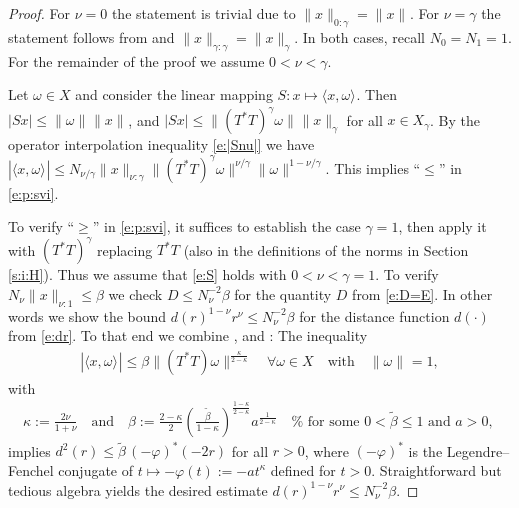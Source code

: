 \documentclass[10pt, a4paper]{iopart}
\newcommand{\norm}[2]{     \| #1       \|_{ #2 }}
\newcommand{\scalar}[2]{     \langle #1       \rangle_{ #2 }}
\theoremstyle{remark}
\theoremstyle{definition}
\begin{document}
\begin{proof}
	For $\nu = 0$ the statement is trivial
	due to
	$\norm{x}{0:\gamma} = \norm{x}{}$.
	For $\nu = \gamma$
	the statement follows from \cite[Lemma 8.21]{ScherzerBook2009}
	and $\norm{x}{\gamma:\gamma} = \norm{x}{\gamma}$.
	In both cases, recall $N_0 = N_1 = 1$.
	For the remainder of the proof 
	we assume $0 < \nu < \gamma$.

	Let $\omega \in X$ 
	and
	consider the linear mapping $S : x \mapsto \scalar{ x, \omega }{}$.
	Then
	$| S x | \leq \norm{\omega}{} \norm{x}{}$,
	and
	$| S x | \leq \norm{(T^* T)^{\gamma} \omega}{} \norm{x}{\gamma}$
	for all $x \in X_{\gamma}$.
	By the operator interpolation inequality \eqref{e:|Snu|}
	we have
	$
		| \scalar{ x, \omega }{} |
	\leq
		N_{\nu/\gamma}
		\norm{x}{\nu : \gamma}
		\norm{(T^* T)^{\gamma} \omega}{}^{\nu/\gamma}
		\norm{\omega}{}^{1 - \nu/\gamma}
	$.
	This implies ``$\leq$'' in \eqref{e:p:svi}.
	
	
	To verify ``$\geq$'' in \eqref{e:p:svi},
	it suffices to establish the case $\gamma = 1$,
	then apply it 
	with $(T^* T)^\gamma$ replacing $T^* T$ 
	(also in the definitions of the norms in Section \ref{s:i:H}).
	Thus we assume that \eqref{e:S} holds with $0 < \nu < \gamma = 1$.
	To verify $N_{\nu} \norm{x}{\nu:1} \leq \beta$
	we check
	$D \leq N_{\nu}^{-2} \beta$
	for the quantity $D$ from \eqref{e:D=E}.
	In other words
	we
	show the bound
	$d(r)^{1 - \nu} r^\nu \leq N_{\nu}^{-2} \beta$
	for
	the distance function $d(\cdot)$ from \eqref{e:dr}.
	To that end we 
	combine \cite[Proposition 2.10]{Flemming2012},
	\cite[Theorem 4.1]{Flemming2012}
	and \cite[Theorem 4.5]{Flemming2012}:
	The inequality
	\begin{align}
		| \scalar{ x, \omega }{} |
		\leq
		\beta
		\norm{ (T^* T) \omega }{}^{\frac{\kappa}{2 - \kappa}}
		\quad
		\forall \omega \in X
		\quad\text{with}\quad
		\norm{\omega}{} = 1,
	\end{align}
	with 
	\begin{align}
		\kappa := 
		\tfrac{2 \nu}{1 + \nu}
		\quad\text{and}\quad
		\beta :=
		\tfrac{2 - \kappa}{2}
		\left(
			\tfrac{\tilde\beta}{1 - \kappa} 
		\right)^{\frac{1 - \kappa}{2 - \kappa}}
		a^{\frac{1}{2 - \kappa}}
		\quad
		\text{%
			for some $0 < \tilde\beta \leq 1$ and $a > 0$,
		}
	\end{align}
	implies
	$
		d^2(r) \leq 
		\tilde\beta \, (-\varphi)^*(-2 r)
	$
	for all $r > 0$,
	where $(-\varphi)^*$ is the Legendre--Fenchel conjugate
	of $t \mapsto -\varphi(t) := -a t^\kappa$ defined for $t > 0$.
	Straightforward but tedious algebra
	yields
	the desired estimate 
	$d(r)^{1 - \nu} r^\nu \leq N_{\nu}^{-2} \beta$.
\end{proof}
\end{document}
